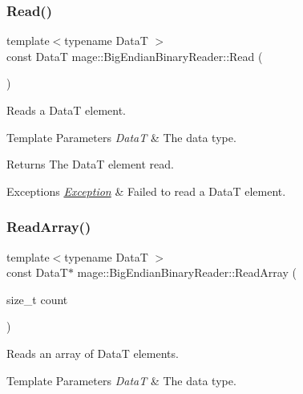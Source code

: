 \subsubsection{\texorpdfstring{Read()}{Read()}}
{\footnotesize\ttfamily template$<$typename DataT $>$ \\
const DataT mage\+::\+Big\+Endian\+Binary\+Reader\+::\+Read (\begin{DoxyParamCaption}{ }\end{DoxyParamCaption})\hspace{0.3cm}{\ttfamily [protected]}}

Reads a {\ttfamily DataT} element.


\begin{DoxyTemplParams}{Template Parameters}
{\em DataT} & The data type. \\
\hline
\end{DoxyTemplParams}
\begin{DoxyReturn}{Returns}
The {\ttfamily DataT} element read. 
\end{DoxyReturn}

\begin{DoxyExceptions}{Exceptions}
{\em \hyperlink{classmage_1_1_exception}{Exception}} & Failed to read a {\ttfamily DataT} element. \\
\hline
\end{DoxyExceptions}
\hypertarget{classmage_1_1_big_endian_binary_reader_a534f06cc9b44757271595c614e8793d2}{}\label{classmage_1_1_big_endian_binary_reader_a534f06cc9b44757271595c614e8793d2} 
\subsubsection{\texorpdfstring{Read\+Array()}{ReadArray()}}
{\footnotesize\ttfamily template$<$typename DataT $>$ \\
const DataT$\ast$ mage\+::\+Big\+Endian\+Binary\+Reader\+::\+Read\+Array (\begin{DoxyParamCaption}\item[{size\+\_\+t}]{count }\end{DoxyParamCaption})\hspace{0.3cm}{\ttfamily [protected]}}

Reads an array of {\ttfamily DataT} elements.


\begin{DoxyTemplParams}{Template Parameters}
{\em DataT} & The data type. \\
\hline
\end{DoxyTemplParams}


